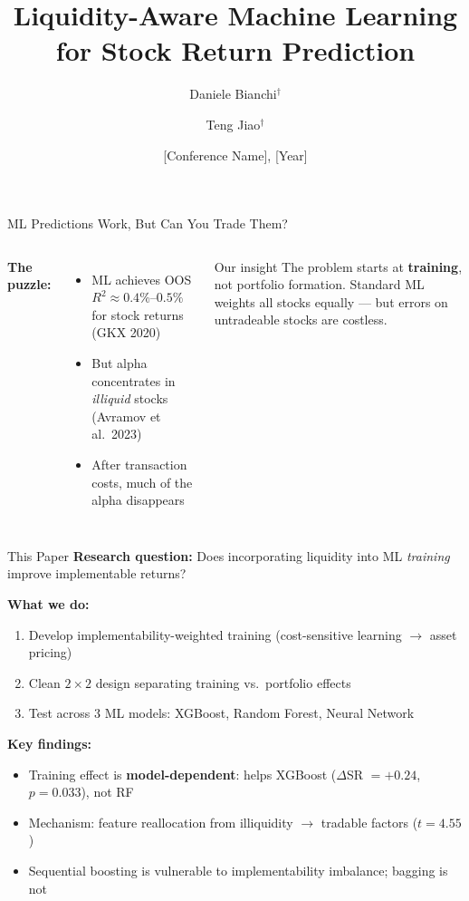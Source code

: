 \documentclass[10pt]{beamer}
\title{Liquidity-Aware Machine Learning\\for Stock Return Prediction}
\author{Daniele Bianchi$^{\dagger}$ \and Teng Jiao$^{\dagger}$}
\institute{Queen Mary University of London}
\date{[Conference Name], [Year]}
\newcommand{\beaverarrow}{{\color{accent}$\hookrightarrow$\,}}
\begin{document}
\maketitle


\begin{frame}{ML Predictions Work, But Can You Trade Them?}
\begin{columns}[T]
\textbf{The puzzle:}

\vspace{0.5em}
\begin{itemize}
  \item[\beaverarrow] ML achieves OOS $R^2 \approx 0.4\%$--$0.5\%$ for stock returns (GKX 2020)
  \item[\beaverarrow] But alpha concentrates in \textit{illiquid} stocks (Avramov et al.\ 2023)
  \item[\beaverarrow] After transaction costs, much of the alpha disappears
\end{itemize}

\vspace{0.6em}
\begin{block}{Our insight}
The problem starts at \textbf{training}, not portfolio formation. Standard ML weights all stocks equally --- but errors on untradeable stocks are costless.
\end{block}

\end{columns}
\end{frame}


\begin{frame}{This Paper}
\textbf{Research question:} Does incorporating liquidity into ML \textit{training} improve implementable returns?

\vspace{1em}
\textbf{What we do:}
\begin{enumerate}
  \item Develop implementability-weighted training (cost-sensitive learning $\rightarrow$ asset pricing)
  \item Clean $2\times 2$ design separating training vs.\ portfolio effects
  \item Test across 3 ML models: XGBoost, Random Forest, Neural Network
\end{enumerate}

\vspace{1em}
\textbf{Key findings:}
\begin{itemize}
  \item[\beaverarrow] Training effect is \textbf{model-dependent}: helps XGBoost ($\Delta$SR $= +0.24$, $p = 0.033$), not RF
  \item[\beaverarrow] Mechanism: feature reallocation from illiquidity $\rightarrow$ tradable factors ($t = 4.55$)
  \item[\beaverarrow] Sequential boosting is vulnerable to implementability imbalance; bagging is not
\end{itemize}
\end{frame}
\end{document}
